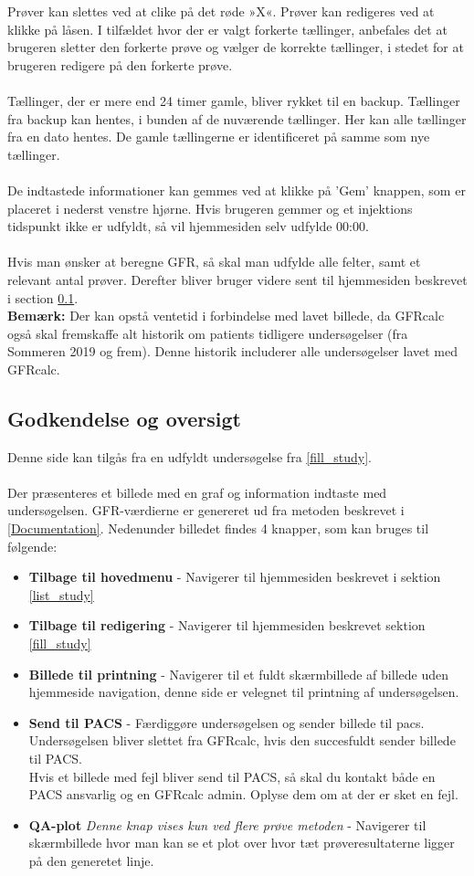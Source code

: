 \documentclass{article}
\begin{document}
Prøver kan slettes ved at clike på det røde »X«. Prøver kan redigeres ved at klikke på låsen. I tilfældet hvor der er valgt forkerte tællinger, anbefales det at brugeren sletter den forkerte prøve og vælger de korrekte tællinger, i stedet for at brugeren redigere på den forkerte prøve.\\\\
Tællinger, der er mere end 24 timer gamle, bliver rykket til en backup. Tællinger fra backup kan hentes, i bunden af de nuværende tællinger. Her kan alle tællinger fra en dato hentes. De gamle tællingerne er identificeret på samme som nye tællinger.
\\\\
De indtastede informationer kan gemmes ved at klikke på 'Gem' knappen, som er placeret i nederst venstre hjørne. Hvis brugeren gemmer og et injektions tidspunkt ikke er udfyldt, så vil hjemmesiden selv udfylde 00:00.\\\\
Hvis man ønsker at beregne GFR, så skal man udfylde alle felter, samt et relevant antal prøver. Derefter bliver bruger videre sent til hjemmesiden beskrevet i section \ref{present_study}.\\
\textbf{Bemærk:} Der kan opstå ventetid i forbindelse med lavet billede, da GFRcalc også skal fremskaffe alt historik om patients tidligere undersøgelser (fra Sommeren 2019 og frem). Denne historik includerer alle undersøgelser lavet med GFRcalc.  
\subsection{Godkendelse og oversigt}\label{present_study}
Denne side kan tilgås fra en udfyldt undersøgelse fra \ref{fill_study}.\\\\
Der præsenteres et billede med en graf og information indtaste med undersøgelsen. GFR-værdierne er genereret ud fra metoden beskrevet i \ref{Documentation}.  Nedenunder billedet findes 4 knapper, som kan bruges til følgende:
\begin{itemize}
	\item \textbf{Tilbage til hovedmenu} - Navigerer til hjemmesiden beskrevet i sektion \ref{list_study}
	\item \textbf{Tilbage til redigering} - Navigerer til hjemmesiden beskrevet sektion \ref{fill_study}
	\item \textbf{Billede til printning} - Navigerer til et fuldt skærmbillede af billede uden hjemmeside navigation, denne side er velegnet til printning af undersøgelsen.
	\item \textbf{Send til PACS} - Færdiggøre undersøgelsen og sender billede til pacs. Undersøgelsen bliver slettet fra GFRcalc, hvis den succesfuldt sender billede til PACS.\\
	Hvis et billede med fejl bliver send til PACS, så skal du kontakt både en PACS ansvarlig og en GFRcalc admin. Oplyse dem om at der er sket en fejl.   
	\item \textbf{QA-plot} \textit{Denne knap vises kun ved flere prøve metoden} - Navigerer til skærmbillede hvor man kan se et plot over hvor tæt prøveresultaterne ligger på den generetet linje.
\end{itemize}
\end{document}
